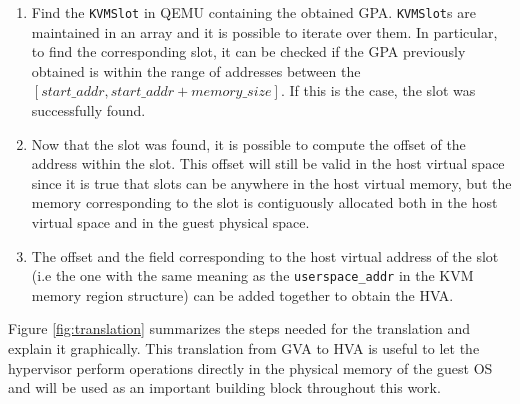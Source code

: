\begin{enumerate}
    \item Find the \texttt{KVMSlot} in QEMU containing the obtained GPA. \texttt{KVMSlot}s are maintained in an array and it is possible to iterate over them. In particular, to find the corresponding slot, it can be checked if the GPA previously obtained is within the range of addresses between the $[start\_addr, start\_addr + memory\_size]$. If this is the case, the slot was successfully found. 
    \item Now that the slot was found, it is possible to compute the offset of the address within the slot. This offset will still be valid in the host virtual space since it is true that slots can be anywhere in the host virtual memory, but the memory corresponding to the slot is contiguously allocated both in the host virtual space and in the guest physical space.
    \item The offset and the field corresponding to the host virtual address of the slot (i.e the one with the same meaning as the \texttt{userspace\_addr} in the KVM memory region structure) can be added together to obtain the HVA.
\end{enumerate}
Figure \ref{fig:translation} summarizes the steps needed for the translation and explain it graphically. This translation from GVA to HVA is useful to let the hypervisor perform operations directly in the physical memory of the guest OS and will be used as an important building block throughout this work. 

